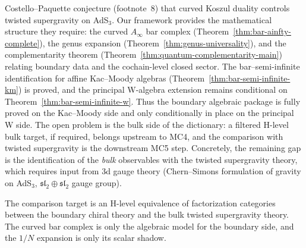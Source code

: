 \begin{remark}[Scope]\label{rem:ads-scope}
Costello--Paquette \cite{CP2020} conjecture (footnote~8) that
curved Koszul duality controls twisted supergravity on AdS$_3$.
Our framework provides the mathematical structure they require:
the curved $A_\infty$ bar complex
(Theorem~\ref{thm:bar-ainfty-complete}), the genus expansion
(Theorem~\ref{thm:genus-universality}), and the
complementarity theorem (Theorem~\ref{thm:quantum-complementarity-main})
relating boundary data and the cochain-level closed sector. The
bar--semi-infinite identification
for affine Kac--Moody algebras
\textup{(}Theorem~\ref{thm:bar-semi-infinite-km}\textup{)}
is proved, and the principal W-algebra extension remains
conditional on Theorem~\ref{thm:bar-semi-infinite-w}. Thus the
boundary algebraic package is fully proved on the
Kac--Moody side and only conditionally in place on the principal
W side. The open problem is
the bulk side of the dictionary: a filtered H-level bulk target, if
required, belongs upstream to MC4, and the comparison with twisted
supergravity is the downstream MC5 step. Concretely, the remaining gap is the
identification of the \emph{bulk} observables with the twisted
supergravity theory, which requires input from 3d gauge theory
(Chern--Simons formulation of gravity on AdS$_3$,
$\mathfrak{sl}_2 \oplus \mathfrak{sl}_2$ gauge group).

The comparison target is an H-level equivalence of factorization
categories between the boundary chiral theory and the bulk twisted
supergravity theory. The curved bar complex is only the algebraic
model for the boundary side, and the $1/N$ expansion is only its
scalar shadow.
\end{remark}

